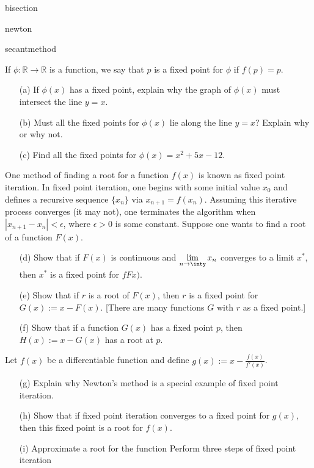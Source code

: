 \documentclass[11pt,letterpaper]{article}
\begin{document}

 bisection


 newton


 secantmethod


\newpage



 If $\phi \colon \mathbb{R} \to \mathbb{R}$ is a function, we say that $p$ is a fixed point for $\phi$ if $f(p)= p$.
	\begin{enumerate}
	\item[(a)] If $\phi(x)$ has a fixed point, explain why the graph of $\phi(x)$ must intersect the line $y= x$.
	\item[(b)] Must all the fixed points for $\phi(x)$ lie along the line $y= x$? Explain why or why not. 
	\item[(c)] Find all the fixed points for $\phi(x)= x^2 + 5x - 12$. 
	\end{enumerate}
One method of finding a root for a function $f(x)$ is known as fixed point iteration. In fixed point iteration, one begins with some initial value $x_0$ and defines a recursive sequence $\{ x_n \}$ via $x_{n+1} = f(x_n)$. Assuming this iterative process converges (it may not), one terminates the algorithm when $|x_{n+1} - x_n| < \epsilon$, where $\epsilon > 0$ is some constant. Suppose one wants to find a root of a function $F(x)$.
	\begin{enumerate}[(a)]
	\item[(d)] Show that if $F(x)$ is continuous and $\displaystyle \lim_{n \to \inty} x_n$ converges to a limit $x^*$, then $x^*$ is a fixed point for $fFx)$. 
	\item[(e)] Show that if $r$ is a root of $F(x)$, then $r$ is a fixed point for $G(x):= x - F(x)$. [There are many functions $G$ with $r$ as a fixed point.]
	\item[(f)] Show that if a function $G(x)$ has a fixed point $p$, then $H(x):= x - G(x)$ has a root at $p$. 
	\end{enumerate}
Let $f(x)$ be a differentiable function and define $g(x):= x - \frac{f(x)}{f'(x)}$. 
	\begin{enumerate}
	\item[(g)] Explain why Newton's method is a special example of fixed point iteration.
	\item[(h)] Show that if fixed point iteration converges to a fixed point for $g(x)$, then this fixed point is a root for $f(x)$. 
	\item[(i)] Approximate a root for the function 
	Perform three steps of fixed point iteration 
	\end{enumerate}
\end{document}
